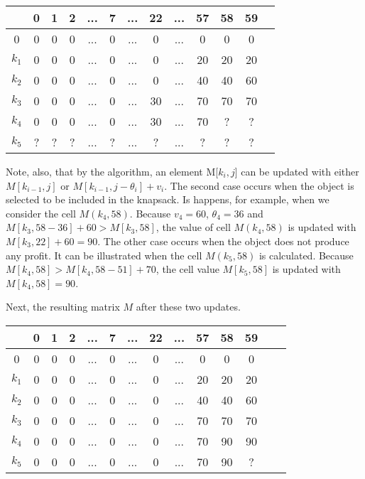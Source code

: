 \begin{center}
\begin{tabular}{ |c|c|c|c|c|c|c|c|c|c|c|c|c| } 
 \hline
 $ $ & 0 & 1 & 2 & ... & 7 & ... & 22 & ... & 57 & 58 & 59 \\
 \hline
 0 & 0 & 0 & 0 & ... & 0 & ... & 0 & ... & 0 & 0 & 0 \\
 \hline
 $k_1$ & 0 & 0 & 0 & ... & 0 & ... & 0 & ... & 20 & 20 & 20 \\
 \hline
 $k_2$ & 0 & 0 & 0 & ... & 0 & ... & 0 & ... & 40 & 40 & 60 \\
 \hline
 $k_3$ & 0 & 0 & 0 & ... & 0 & ... & 30 & ... & 70 & 70 & 70 \\
 \hline
 $k_4$ & 0 & 0 & 0 & ... & 0 & ... & 30 & ... & 70 & ? & ? \\
 \hline
 $k_5$ & ? & ? & ? & ... & ? & ... & ? & ... & ? & ? & ? \\
 \hline
\end{tabular}
\end{center}

Note, also, that by the algorithm, an element  M[$k_i,j$] can be updated  with  either  $M[k_{i-1},j]$ or $M[k_{i-1},j-\theta_i] + v_i$. The second case occurs when the object  is selected to be included in the knapsack. Is happens, for example, when we consider the cell   $M(k_4,58)$. Because   $v_4 = 60$,   $\theta_4 = 36$  and $M[k_3,58-36] + 60 > M[k_3,58]$, the value of cell  $M(k_4,58)$  is updated with   $M[k_3,22] + 60 = 90$.
The other case occurs when the object does not produce any profit. It can be illustrated  when the cell $M(k_5,58)$ is calculated. Because $M[k_4,58] > M[k_4,58-51] + 70$,  the cell value $M[k_5,58]$ is updated  with $M[k_4,58] = 90$.

Next, the resulting matrix $M$ after these two updates.
 
\begin{center}
\begin{tabular}{ |c|c|c|c|c|c|c|c|c|c|c|c|c|c| } 
 \hline
 $ $ & 0 & 1 & 2 & ... & 7 & ... & 22 & ... & 57 & 58 & 59 \\
 \hline
 0 & 0 & 0 & 0 & ... & 0 & ... & 0 & ... & 0 & 0 & 0 \\
 \hline
 $k_1$ & 0 & 0 & 0 & ... & 0 & ... & 0 & ... & 20 & 20 & 20 \\
 \hline
 $k_2$ & 0 & 0 & 0 & ... & 0 & ... & 0 & ... & 40 & 40 & 60 \\
 \hline
 $k_3$ & 0 & 0 & 0 & ... & 0 & ... & 0 & ... & 70 & 70 & 70 \\
 \hline
 $k_4$ & 0 & 0 & 0 & ... & 0 & ... & 0 & ... & 70 & 90 & 90 \\
 \hline
 $k_5$ & 0 & 0 & 0 & ... & 0 & ... & 0 & ... & 70 & 90 & ? \\
 \hline
\end{tabular}
\end{center}
